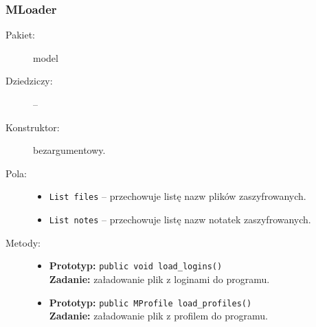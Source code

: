 \documentclass[a4paper]{article}
\newcommand{\prog}{\texttt}
\begin{document}
\subsubsection{MLoader}
\begin{description}
    \item[Pakiet:] model
    \item[Dziedziczy:] --
    \item[Konstruktor:] bezargumentowy.
    \item[Pola:] \hfill
    \begin{itemize}
        \item \prog{List files} -- przechowuje listę nazw plików zaszyfrowanych.
        \item \prog{List notes} -- przechowuje listę nazw notatek zaszyfrowanych.
    \end{itemize}
    \item[Metody:] \hfill
    \begin{itemize}
        \item \textbf{Prototyp:} \prog{public void load\_logins()}\\\textbf{Zadanie:} załadowanie plik z loginami do programu.
        \item \textbf{Prototyp:} \prog{public MProfile load\_profiles()}\\\textbf{Zadanie:} załadowanie plik z profilem do programu.
    \end{itemize}
\end{description}
\end{document}
